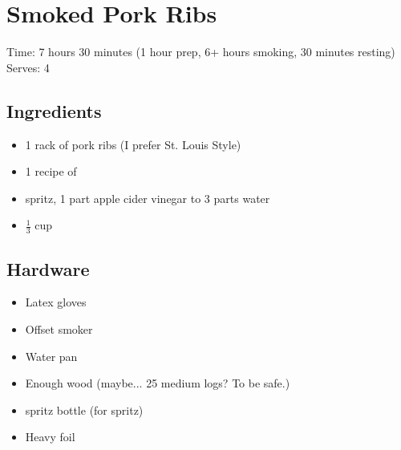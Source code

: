 \section{Smoked Pork Ribs}
\label{smokedPorkRibs}
\setcounter{secnumdepth}{0}
Time: 7 hours 30 minutes (1 hour prep, 6+ hours smoking, 30 minutes resting)
Serves: 4

\begin{multicols}{2}
\subsection*{Ingredients}
\begin{itemize}
    \item 1 rack of pork ribs (I prefer St. Louis Style)
    \item 1 recipe of 
    \item spritz, 1 part apple cider vinegar to 3 parts water
    \item \( \frac{1}{3} \) cup 
\end{itemize}

\subsection*{Hardware}
\begin{itemize}
    \item Latex gloves
    \item Offset smoker
    \item Water pan
    \item Enough wood (maybe... 25 medium logs? To be safe.)
    \item spritz bottle (for spritz)
    \item Heavy foil
\end{itemize}
\clearpage


\end{multicols}
